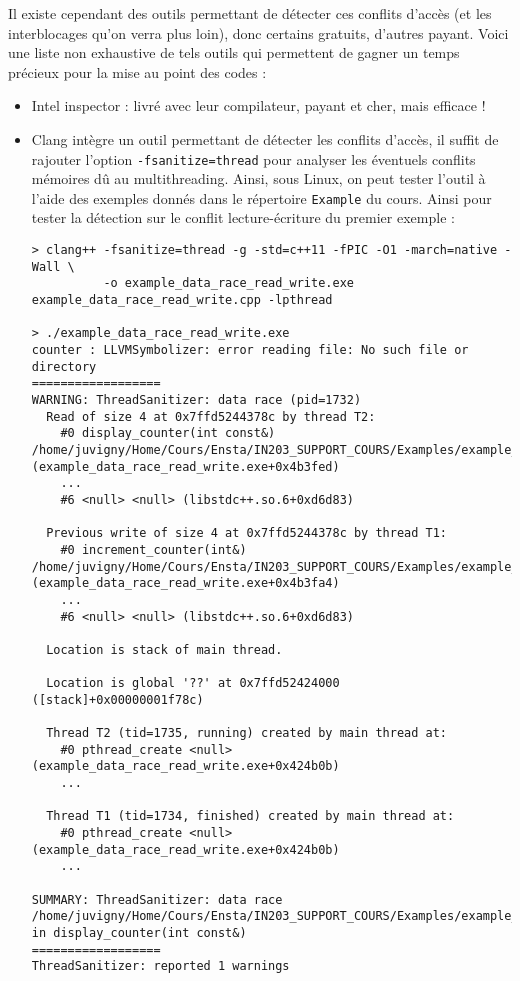 \documentclass[fleqn,11pt]{article}
\begin{document}
Il existe cependant des outils permettant de détecter ces conflits d'accès (et les interblocages qu'on verra plus loin), donc certains gratuits, d'autres payant. Voici une liste non exhaustive de tels outils
qui permettent de gagner un temps précieux pour la mise au point des codes :
\begin{itemize}
  \item Intel inspector : livré avec leur compilateur, payant et cher, mais efficace !
  \item Clang intègre un outil permettant de détecter les conflits d'accès, il suffit de rajouter l'option
  \texttt{-fsanitize=thread} pour analyser les éventuels conflits mémoires dû au multithreading. Ainsi, sous Linux, on peut tester l'outil à l'aide des exemples donnés dans le répertoire \texttt{Example} du cours.
  Ainsi pour tester la détection sur le conflit lecture-écriture du premier exemple :
  \begin{verbatim}
> clang++ -fsanitize=thread -g -std=c++11 -fPIC -O1 -march=native -Wall \
          -o example_data_race_read_write.exe example_data_race_read_write.cpp -lpthread

> ./example_data_race_read_write.exe
counter : LLVMSymbolizer: error reading file: No such file or directory
==================
WARNING: ThreadSanitizer: data race (pid=1732)
  Read of size 4 at 0x7ffd5244378c by thread T2:
    #0 display_counter(int const&) /home/juvigny/Home/Cours/Ensta/IN203_SUPPORT_COURS/Examples/example_data_race_read_write.cpp:16:38 (example_data_race_read_write.exe+0x4b3fed)
    ...
    #6 <null> <null> (libstdc++.so.6+0xd6d83)

  Previous write of size 4 at 0x7ffd5244378c by thread T1:
    #0 increment_counter(int&) /home/juvigny/Home/Cours/Ensta/IN203_SUPPORT_COURS/Examples/example_data_race_read_write.cpp:9:19 (example_data_race_read_write.exe+0x4b3fa4)
    ...
    #6 <null> <null> (libstdc++.so.6+0xd6d83)

  Location is stack of main thread.

  Location is global '??' at 0x7ffd52424000 ([stack]+0x00000001f78c)

  Thread T2 (tid=1735, running) created by main thread at:
    #0 pthread_create <null> (example_data_race_read_write.exe+0x424b0b)
    ...

  Thread T1 (tid=1734, finished) created by main thread at:
    #0 pthread_create <null> (example_data_race_read_write.exe+0x424b0b)
    ...

SUMMARY: ThreadSanitizer: data race /home/juvigny/Home/Cours/Ensta/IN203_SUPPORT_COURS/Examples/example_data_race_read_write.cpp:16:38 in display_counter(int const&)
==================
ThreadSanitizer: reported 1 warnings
  \end{verbatim}


\end{itemize}
\end{document}
